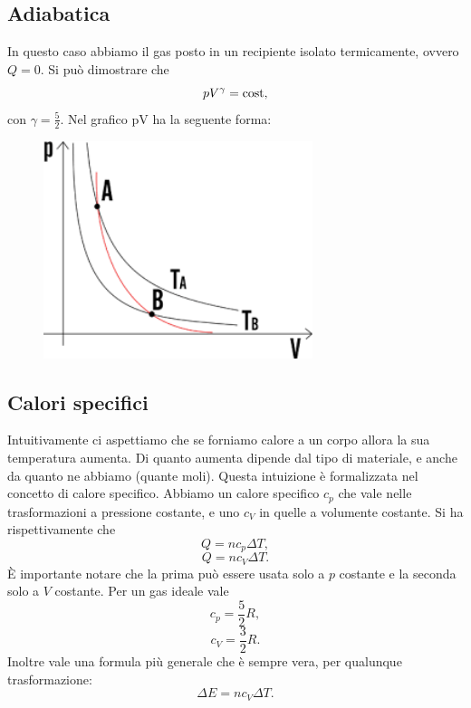 \documentclass{article}
\theoremstyle{definition}
\begin{document}
\subsection{Adiabatica}

In questo caso abbiamo il gas posto in un recipiente isolato termicamente, ovvero $Q=0$. Si può dimostrare che $$pV^\gamma=\textup{cost},$$ con $\gamma=\frac{5}{2}$. Nel grafico pV ha la seguente forma:
\begin{figure}[H]
    \centering
    \includegraphics[width=0.7\textwidth]{images/adiab.png}
\end{figure}

\subsection{Calori specifici}
Intuitivamente ci aspettiamo che se forniamo calore a un corpo allora la sua temperatura aumenta. Di quanto aumenta dipende dal tipo di materiale, e anche da quanto ne abbiamo (quante moli). Questa intuizione è formalizzata nel concetto di calore specifico. Abbiamo un calore specifico $c_p$ che vale nelle trasformazioni a pressione costante, e uno $c_V$ in quelle a volumente costante. Si ha rispettivamente che $$Q=nc_p\Delta T,$$ $$Q=nc_V\Delta T.$$ È importante notare che la prima può essere usata solo a $p$ costante e la seconda solo a $V$ costante. Per un gas ideale vale $$c_p=\frac{5}{2}R,$$$$c_V=\frac{3}{2}R.$$ Inoltre vale una formula più generale che è sempre vera, per qualunque trasformazione: $$\Delta E=nc_V\Delta T.$$
\end{document}
